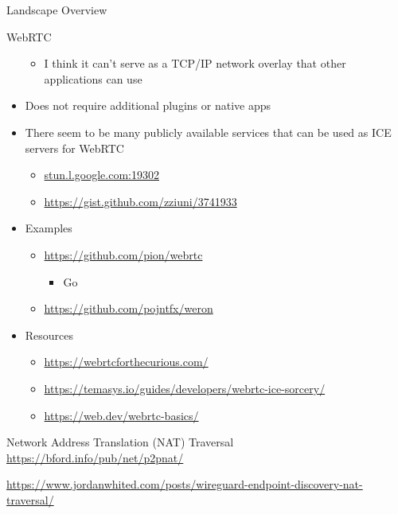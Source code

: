 \begin{frame}[fragile]{Landscape Overview}
\begin{block}{WebRTC}
\begin{itemize}
  \begin{itemize}
  \tightlist
  \item
    I think it can't serve as a TCP/IP network overlay that other
    applications can use
  \end{itemize}
\item
  Does not require additional plugins or native apps
\item
  There seem to be many publicly available services that can be used as
  ICE servers for WebRTC

  \begin{itemize}
  \tightlist
  \item
    \href{http://stun.l.google.com:19302/}{stun.l.google.com:19302}
  \item
    \url{https://gist.github.com/zziuni/3741933}
  \end{itemize}
\item
  Examples

  \begin{itemize}
  \tightlist
  \item
    \url{https://github.com/pion/webrtc}

    \begin{itemize}
    \tightlist
    \item
      Go
    \end{itemize}
  \item
    \url{https://github.com/pojntfx/weron}
  \end{itemize}
\item
  Resources

  \begin{itemize}
  \tightlist
  \item
    \url{https://webrtcforthecurious.com/}
  \item
    \url{https://temasys.io/guides/developers/webrtc-ice-sorcery/}
  \item
    \href{https://web.dev/webrtc-basics/\#toc-rtcpeerconnection}{https://web.dev/webrtc-basics/}
  \end{itemize}
\end{itemize}
\end{block}

\begin{block}{Network Address Translation (NAT) Traversal}
\protect\hypertarget{network-address-translation-nat-traversal}{}
\url{https://bford.info/pub/net/p2pnat/}

\url{https://www.jordanwhited.com/posts/wireguard-endpoint-discovery-nat-traversal/}


\end{block}
\end{frame}
